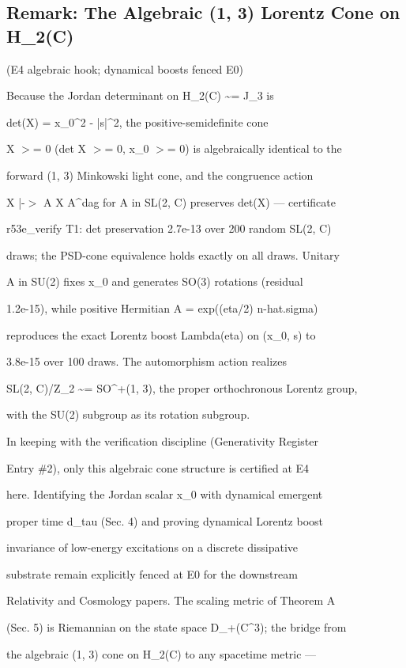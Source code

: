 \documentclass[11pt,a4paper]{article}
\theoremstyle{definition}
\begin{document}
\subsection{Remark: The Algebraic (1, 3) Lorentz Cone on H\_2(C)}
(E4 algebraic hook; dynamical boosts fenced E0)

Because the Jordan determinant on H\_2(C) \textasciitilde{}= J\_3 is

det(X) = x\_0\^{}2 - |s|\^{}2, the positive-semidefinite cone

X $>$= 0 (det X $>$= 0, x\_0 $>$= 0) is algebraically identical to the

forward (1, 3) Minkowski light cone, and the congruence action

X |-$>$ A X A\^{}dag for A in SL(2, C) preserves det(X) — certificate

r53e\_verify T1: det preservation 2.7e-13 over 200 random SL(2, C)

draws; the PSD-cone equivalence holds exactly on all draws. Unitary

A in SU(2) fixes x\_0 and generates SO(3) rotations (residual

1.2e-15), while positive Hermitian A = exp((eta/2) n-hat.sigma)

reproduces the exact Lorentz boost Lambda(eta) on (x\_0, s) to

3.8e-15 over 100 draws. The automorphism action realizes

SL(2, C)/Z\_2 \textasciitilde{}= SO\^{}+(1, 3), the proper orthochronous Lorentz group,

with the SU(2) subgroup as its rotation subgroup.


In keeping with the verification discipline (Generativity Register

Entry \#2), only this algebraic cone structure is certified at E4

here. Identifying the Jordan scalar x\_0 with dynamical emergent

proper time d\_tau (Sec. 4) and proving dynamical Lorentz boost

invariance of low-energy excitations on a discrete dissipative

substrate remain explicitly fenced at E0 for the downstream

Relativity and Cosmology papers. The scaling metric of Theorem A

(Sec. 5) is Riemannian on the state space D\_+(C\^{}3); the bridge from

the algebraic (1, 3) cone on H\_2(C) to any spacetime metric —
\end{document}
